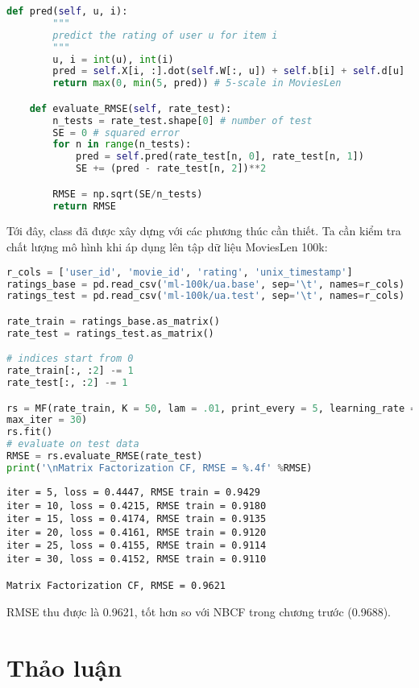 \begin{lstlisting}[language=Python]
    def pred(self, u, i):
        """
        predict the rating of user u for item i
        """
        u, i = int(u), int(i)
        pred = self.X[i, :].dot(self.W[:, u]) + self.b[i] + self.d[u]
        return max(0, min(5, pred)) # 5-scale in MoviesLen

    def evaluate_RMSE(self, rate_test):
        n_tests = rate_test.shape[0] # number of test
        SE = 0 # squared error
        for n in range(n_tests):
            pred = self.pred(rate_test[n, 0], rate_test[n, 1])
            SE += (pred - rate_test[n, 2])**2

        RMSE = np.sqrt(SE/n_tests)
        return RMSE
\end{lstlisting}

Tới đây, class  đã được xây dựng với các phương thúc
cần thiết. Ta cần kiểm tra chất lượng mô hình khi áp dụng
lên tập dữ liệu MoviesLen 100k:
\begin{lstlisting}[language=Python]
r_cols = ['user_id', 'movie_id', 'rating', 'unix_timestamp']
ratings_base = pd.read_csv('ml-100k/ua.base', sep='\t', names=r_cols)
ratings_test = pd.read_csv('ml-100k/ua.test', sep='\t', names=r_cols)

rate_train = ratings_base.as_matrix()
rate_test = ratings_test.as_matrix()

# indices start from 0
rate_train[:, :2] -= 1
rate_test[:, :2] -= 1

rs = MF(rate_train, K = 50, lam = .01, print_every = 5, learning_rate = 50,
max_iter = 30)
rs.fit()
# evaluate on test data
RMSE = rs.evaluate_RMSE(rate_test)
print('\nMatrix Factorization CF, RMSE = %.4f' %RMSE)
\end{lstlisting}
\kq
\begin{lstlisting}
iter = 5, loss = 0.4447, RMSE train = 0.9429
iter = 10, loss = 0.4215, RMSE train = 0.9180
iter = 15, loss = 0.4174, RMSE train = 0.9135
iter = 20, loss = 0.4161, RMSE train = 0.9120
iter = 25, loss = 0.4155, RMSE train = 0.9114
iter = 30, loss = 0.4152, RMSE train = 0.9110

Matrix Factorization CF, RMSE = 0.9621
\end{lstlisting}

RMSE thu được là 0.9621, tốt hơn so với NBCF trong chương trước (0.9688).

\section{Thảo luận}
\label{sec:25_4}

